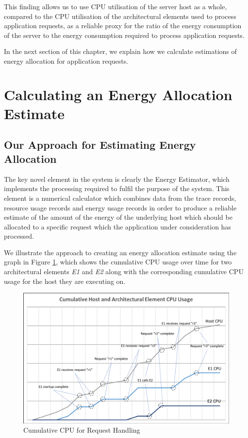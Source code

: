 This finding allows us to use CPU utilisation of the server host as a whole, compared to the CPU utilisation of the architectural elements used to process application requests, as a reliable proxy for the ratio of the energy consumption of the server to the energy consumption required to process application requests.

In the next section of this chapter, we explain how we calculate estimations of energy allocation for application requests.

\section{Calculating an Energy Allocation Estimate}

\subsection{Our Approach for Estimating Energy Allocation}

The key novel element in the system is clearly the Energy Estimator, which implements the processing required to fulfil the purpose of the system.  This element is a numerical calculator which combines data from the trace records, resource usage records and energy usage records in order to produce a reliable estimate of the amount of the energy of the underlying host which should be allocated to a specific request which the application under consideration has processed.

We illustrate the approach to creating an energy allocation estimate using the graph in Figure \ref{figure:cpuusage}, which shows the cumulative CPU usage over time for two architectural elements \emph{E1} and \emph{E2} along with the corresponding cumulative CPU usage for the host they are executing on.

\begin{figure}
\centering
\includegraphics[width=1.0\textwidth]{Figures/estimating-energy-cpuusage}
\caption{Cumulative CPU for Request Handling}
\label{figure:cpuusage}
\end{figure}


